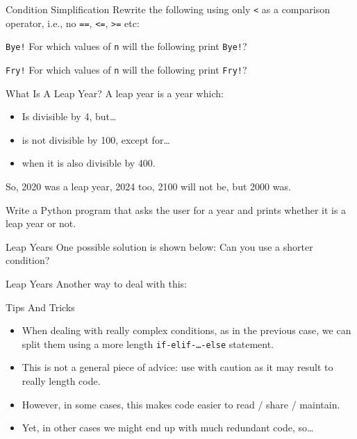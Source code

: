 \documentclass[aspectratio=169, 12pt, xcolor=table]{beamer}
\begin{document}
	\begin{frame}{Condition Simplification}
		Rewrite the following using only \texttt{<} as a comparison operator, i.e., no \texttt{==}, \texttt{<=}, \texttt{>=} etc:
		
	\end{frame}
	
	\begin{frame}{\texttt{Bye!}}
		For which values of \texttt{n} will the following print \texttt{Bye!}?
		
	\end{frame}

	\begin{frame}{\texttt{Fry!}}
		For which values of \texttt{n} will the following print \texttt{Fry!}?
		
	\end{frame}
	
	\begin{frame}{What Is A Leap Year?}
		A leap year is a year which:\pause
		\begin{itemize}
			\item Is divisible by 4, but\ldots\pause
			\item is not divisible by 100, except for\ldots\pause
			\item when it is also divisible by 400.\pause
		\end{itemize}
		So, 2020 was a leap year, 2024 too, 2100 will not be, but 2000 was.
		
		Write a Python program that asks the user for a year and prints whether it is a leap year or not.
	\end{frame}

	\begin{frame}{Leap Years}
		One possible solution is shown below:
		\pause
		Can you use a shorter condition?
	\end{frame}

	\begin{frame}{Leap Years}
		Another way to deal with this:
		
	\end{frame}

	\begin{headsup}{Tips And Tricks}
		\begin{itemize}
			\item When dealing with really complex conditions, as in the previous case, we can split them using a more length \texttt{if-elif-\ldots-else} statement.
			\item This is not a general piece of advice: use with caution as it may result to really length code.
			\item However, in some cases, this makes code easier to read / share / maintain.
			\item Yet, in other cases we might end up with much redundant code, so\ldots
		\end{itemize}
	\end{headsup}
\end{document}
